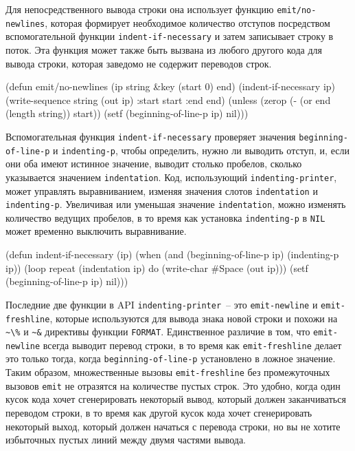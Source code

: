 Для непосредственного вывода строки она использует функцию \lstinline{emit/no-newlines},
которая формирует необходимое количество отступов посредством вспомогательной функции
\lstinline{indent-if-necessary} и затем записывает строку в поток.  Эта функция может также
быть вызвана из любого другого кода для вывода строки, которая заведомо не содержит
переводов строк.

\begin{myverb}
(defun emit/no-newlines (ip string &key (start 0) end)
  (indent-if-necessary ip)
  (write-sequence string (out ip) :start start :end end)
  (unless (zerop (- (or end (length string)) start))
    (setf (beginning-of-line-p ip) nil)))
\end{myverb}

Вспомогательная функция \lstinline{indent-if-necessary} проверяет значения
\lstinline{beginning-of-line-p} и \lstinline{indenting-p}, чтобы определить, нужно ли
выводить отступ, и, если они оба имеют истинное значение, выводит столько пробелов,
сколько указывается значением \lstinline{indentation}. Код, использующий
\lstinline{indenting-printer}, может управлять выравниванием, изменяя значения слотов
\lstinline{indentation} и \lstinline{indenting-p}. Увеличивая или уменьшая значение
\lstinline{indentation}, можно изменять количество ведущих пробелов, в то время как
установка \lstinline{indenting-p} в \lstinline{NIL} может временно выключить выравнивание.

\begin{myverb}
(defun indent-if-necessary (ip)
  (when (and (beginning-of-line-p ip) (indenting-p ip))
    (loop repeat (indentation ip) do (write-char #\bslash{}Space (out ip)))
    (setf (beginning-of-line-p ip) nil)))
\end{myverb}

Последние две функции в API \lstinline{indenting-printer}~-- это \lstinline{emit-newline} и
\lstinline{emit-freshline}, которые используются для вывода знака новой строки и похожи на
\lstinline!~\%! и \lstinline!~&! директивы функции \lstinline{FORMAT}. Единственное различие в
том, что \lstinline{emit-newline} всегда выводит перевод строки, в то время как
\lstinline{emit-freshline} делает это только тогда, когда \lstinline{beginning-of-line-p}
установлено в ложное значение. Таким образом, множественные вызовы \lstinline{emit-freshline}
без промежуточных вызовов \lstinline{emit} не отразятся на количестве пустых строк. Это удобно,
когда один кусок кода хочет сгенерировать некоторый вывод, который должен заканчиваться
переводом строки, в то время как другой кусок кода хочет сгенерировать некоторый выход,
который должен начаться с перевода строки, но вы не хотите избыточных пустых линий между
двумя частями вывода.

